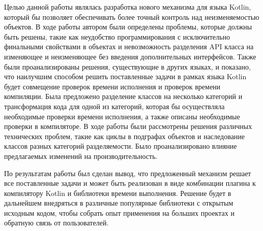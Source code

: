 \documentclass[specification,annotation,times]{itmo-student-thesis}
\begin{document}
Целью данной работы являлась разработка нового механизма для языка Kotlin, который бы позволяет обеспечивать более точный контроль над неизменяемостью объектов.
В ходе работы автором были определены проблемы, которые должны быть решены, такие как неудобство программирования с исключительно финальными свойствами в объектах и невозможность разделения API класса на изменяющее и неизменяющее без введения дополнительных интерфейсов.
Также были проанализированы решения, существующие в других языках, и показано, что наилучшим способом решить поставленные задачи в рамках языка Kotlin будет совмещение проверок времени исполнения и проверок времени компиляции.
Была предложено разделение классов на несколько категорий и трансформация кода для одной из категорий, которая бы осуществляла необходимые проверки времени исполнения, а также описаны необходимые проверки в компиляторе.
В ходе работы были рассмотрены решения различных технических проблем, такие как циклы в подграфах объектов и наследование классов разных категорий разделяемости. Было проанализировано влияние предлагаемых изменений на производительность.

По результатам работы был сделан вывод, что предложенный механизм решает все поставленные задачи и может быть реализован в виде комбинации плагина к компилятору Kotlin и библиотеки времени выполнения.
Решение будет в дальнейшем внедряться в различные популярные библиотеки с открытым исходным кодом, чтобы собрать опыт применения на больших проектах и обратную связь от пользователей.


\printmainbibliography


\end{document}
